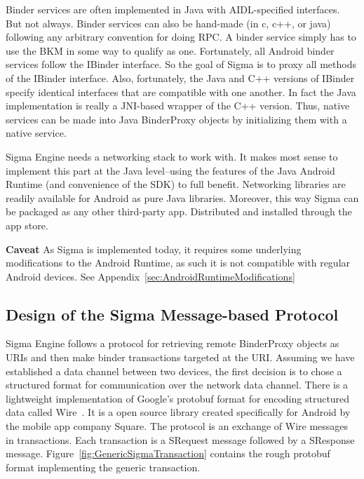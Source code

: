 \documentclass[prodmode]{acmlarge}
\begin{document}
Binder services are often implemented in Java with AIDL-specified interfaces. But not always. Binder services can also be hand-made (in c, c++, or java) following any arbitrary convention for doing RPC. A binder service simply has to use the BKM in some way to qualify as one. Fortunately, all Android binder services follow the IBinder interface. So the goal of Sigma is to proxy all methods of the IBinder interface. Also, fortunately, the Java and C++ versions of IBinder specify identical interfaces that are compatible with one another. In fact the Java implementation is really a JNI-based wrapper of the C++ version. Thus, native services can be made into Java BinderProxy objects by initializing them with a native service.

Sigma Engine needs a networking stack to work with. It makes most sense to implement this part at the Java level--using the features of the Java Android Runtime (and convenience of the SDK) to full benefit. Networking libraries are readily available for Android as pure Java libraries. Moreover, this way Sigma can be packaged as any other third-party app. Distributed and installed through the app store.

\textbf{Caveat} As Sigma is implemented today, it requires some underlying modifications to the Android Runtime, as such it is not compatible with regular Android devices. See Appendix~\ref{sec:AndroidRuntimeModifications}

\subsection{Design of the Sigma Message-based Protocol}
Sigma Engine follows a protocol for retrieving remote BinderProxy objects as URIs and then make binder transactions targeted at the URI. Assuming we have established a data channel between two devices, the first decision is to chose a structured format for communication over the network data channel. There is a lightweight implementation of Google's protobuf format for encoding structured data called Wire~\cite{Wire,IntroWire}. It is a open source library created specifically for Android by the mobile app company Square. The protocol is an exchange of Wire messages in transactions. Each transaction is a SRequest message followed by a SResponse message. Figure~\ref{fig:GenericSigmaTransaction} contains the rough protobuf format implementing the generic transaction.
\end{document}
